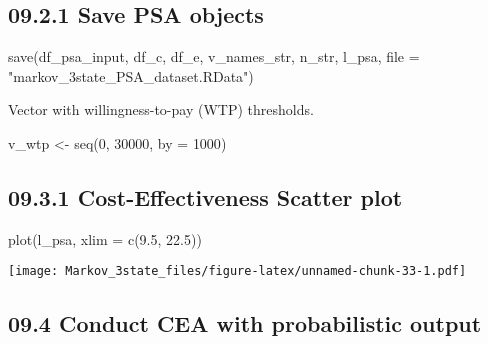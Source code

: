 \documentclass[
]{article}
\newenvironment{Shaded}{\begin{snugshade}}{\end{snugshade}}
\newcommand{\AttributeTok}[1]{\textcolor[rgb]{0.77,0.63,0.00}{#1}}
\newcommand{\DecValTok}[1]{\textcolor[rgb]{0.00,0.00,0.81}{#1}}
\newcommand{\FloatTok}[1]{\textcolor[rgb]{0.00,0.00,0.81}{#1}}
\newcommand{\FunctionTok}[1]{\textcolor[rgb]{0.00,0.00,0.00}{#1}}
\newcommand{\NormalTok}[1]{#1}
\newcommand{\OtherTok}[1]{\textcolor[rgb]{0.56,0.35,0.01}{#1}}
\newcommand{\StringTok}[1]{\textcolor[rgb]{0.31,0.60,0.02}{#1}}
\begin{document}
\hypertarget{save-psa-objects}{%
\subsection{09.2.1 Save PSA objects}\label{save-psa-objects}}

\begin{Shaded}
\begin{Highlighting}[]
\FunctionTok{save}\NormalTok{(df\_psa\_input, df\_c, df\_e, v\_names\_str, n\_str, l\_psa,}
     \AttributeTok{file =} \StringTok{"markov\_3state\_PSA\_dataset.RData"}\NormalTok{)}
\end{Highlighting}
\end{Shaded}

Vector with willingness-to-pay (WTP) thresholds.

\begin{Shaded}
\begin{Highlighting}[]
\NormalTok{v\_wtp }\OtherTok{\textless{}{-}} \FunctionTok{seq}\NormalTok{(}\DecValTok{0}\NormalTok{, }\DecValTok{30000}\NormalTok{, }\AttributeTok{by =} \DecValTok{1000}\NormalTok{)}
\end{Highlighting}
\end{Shaded}

\hypertarget{cost-effectiveness-scatter-plot}{%
\subsection{09.3.1 Cost-Effectiveness Scatter
plot}\label{cost-effectiveness-scatter-plot}}

\begin{Shaded}
\begin{Highlighting}[]
\FunctionTok{plot}\NormalTok{(l\_psa, }\AttributeTok{xlim =} \FunctionTok{c}\NormalTok{(}\FloatTok{9.5}\NormalTok{, }\FloatTok{22.5}\NormalTok{))}
\end{Highlighting}
\end{Shaded}

\texttt{[image: Markov\_3state\_files/figure-latex/unnamed-chunk-33-1.pdf]}

\hypertarget{conduct-cea-with-probabilistic-output}{%
\subsection{09.4 Conduct CEA with probabilistic
output}\label{conduct-cea-with-probabilistic-output}}
\end{document}
